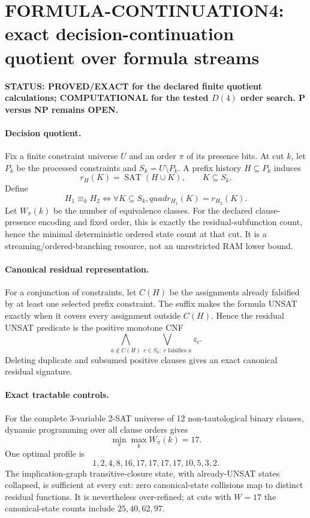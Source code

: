 \section*{FORMULA-CONTINUATION4: exact decision-continuation quotient over formula streams}

\textbf{STATUS: PROVED/EXACT for the declared finite quotient calculations; COMPUTATIONAL for the tested $D(4)$ order search. P versus NP remains OPEN.}

\paragraph{Decision quotient.}
Fix a finite constraint universe $U$ and an order $\pi$ of its presence bits.  At cut $k$,
let $P_k$ be the processed constraints and $S_k=U\setminus P_k$.  A prefix history
$H\subseteq P_k$ induces
\[
r_H(K)=\operatorname{SAT}(H\cup K),\qquad K\subseteq S_k.
\]
Define
\[
H_1\equiv_k H_2
\iff
\forall K\subseteq S_k,quad
r_{H_1}(K)=r_{H_2}(K).
\]
Let $W_\pi(k)$ be the number of equivalence classes.  For the declared clause-presence
encoding and fixed order, this is exactly the residual-subfunction count, hence the minimal
deterministic ordered state count at that cut.  It is a streaming/ordered-branching resource,
not an unrestricted RAM lower bound.

\paragraph{Canonical residual representation.}
For a conjunction of constraints, let $C(H)$ be the assignments already falsified by at
least one selected prefix constraint.  The suffix makes the formula UNSAT exactly when it
covers every assignment outside $C(H)$.  Hence the residual UNSAT predicate is the positive
monotone CNF
\[
\bigwedge_{a\notin C(H)}
\bigvee_{c\in S_k:\ c\text{ falsifies }a} z_c.
\]
Deleting duplicate and subsumed positive clauses gives an exact canonical residual signature.

\paragraph{Exact tractable controls.}
For the complete 3-variable 2-SAT universe of 12 non-tautological binary clauses,
dynamic programming over all clause orders gives
\[
\boxed{\min_\pi\max_k W_\pi(k)=17}.
\]
One optimal profile is
\[
1,2,4,8,16,17,17,17,17,10,5,3,2.
\]
The implication-graph transitive-closure state, with already-UNSAT states collapsed, is
sufficient at every cut: zero canonical-state collisions map to distinct residual functions.
It is nevertheless over-refined; at cuts with $W=17$ the canonical-state counts include
$25,40,62,97$.

